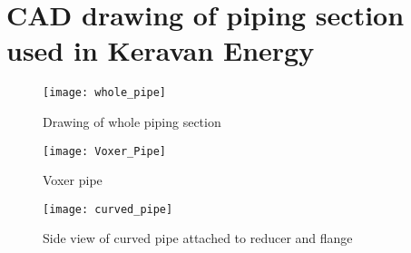 


\chapter{CAD drawing of piping section used in Keravan Energy}\label{appx:second}

\begin{figure}[h!]
  \centering
  \texttt{[image: whole\_pipe]}
  \caption{Drawing of whole piping section}
  \label{fig:pipeview}
\end{figure}

\begin{figure}[h!]
  \centering
  \texttt{[image: Voxer\_Pipe]}
  \caption{Voxer pipe}
  \label{fig:voxpipe}
\end{figure}

\begin{figure}[h!]
  \centering
  \texttt{[image: curved\_pipe]}
  \caption{Side view of curved pipe attached to reducer and flange}
  \label{fig:flange}
\end{figure}

\clearpage